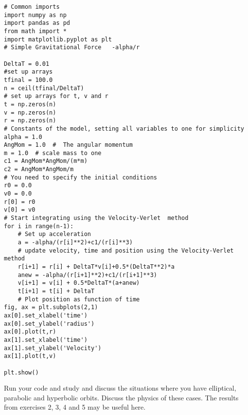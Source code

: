 \documentclass[%
oneside,                 %
final,                   %
10pt]{article}
\begin{document}
\begin{verbatim}
# Common imports
import numpy as np
import pandas as pd
from math import *
import matplotlib.pyplot as plt
# Simple Gravitational Force   -alpha/r
    
DeltaT = 0.01
#set up arrays 
tfinal = 100.0
n = ceil(tfinal/DeltaT)
# set up arrays for t, v and r
t = np.zeros(n)
v = np.zeros(n)
r = np.zeros(n)
# Constants of the model, setting all variables to one for simplicity
alpha = 1.0
AngMom = 1.0  #  The angular momentum
m = 1.0  # scale mass to one
c1 = AngMom*AngMom/(m*m)
c2 = AngMom*AngMom/m
# You need to specify the initial conditions
r0 = 0.0
v0 = 0.0
r[0] = r0
v[0] = v0
# Start integrating using the Velocity-Verlet  method
for i in range(n-1):
    # Set up acceleration
    a = -alpha/(r[i]**2)+c1/(r[i]**3)
    # update velocity, time and position using the Velocity-Verlet method
    r[i+1] = r[i] + DeltaT*v[i]+0.5*(DeltaT**2)*a
    anew = -alpha/(r[i+1]**2)+c1/(r[i+1]**3)
    v[i+1] = v[i] + 0.5*DeltaT*(a+anew)
    t[i+1] = t[i] + DeltaT
    # Plot position as function of time
fig, ax = plt.subplots(2,1)
ax[0].set_xlabel('time')
ax[0].set_ylabel('radius')
ax[0].plot(t,r)
ax[1].set_xlabel('time')
ax[1].set_ylabel('Velocity')
ax[1].plot(t,v)

plt.show()

\end{verbatim}


Run your code and study and discuss the situations where you have elliptical, parabolic and hyperbolic orbits. Discuss the physics of these cases. The results from exercises 2, 3, 4 and 5 may be useful here. 


\end{document}
